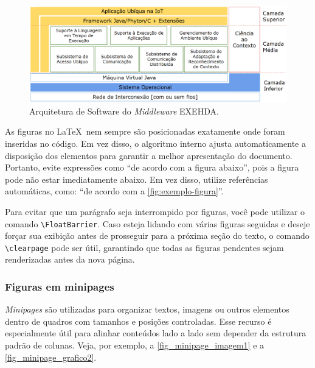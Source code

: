 \begin{figure}[!htbp]
    \centering
    \caption{\label{fig:exemplo-figura} Arquitetura de Software do \textit{Middleware} EXEHDA.}
    \includegraphics[width=\textwidth]{img/ArquiteturaExehda_v4-pt_BR.png}
    
\end{figure}

As figuras no \LaTeX\ nem sempre são posicionadas exatamente onde foram inseridas no código. Em vez disso, o algoritmo interno ajusta automaticamente a disposição dos elementos para garantir a melhor apresentação do documento. Portanto, evite expressões como ``de acordo com a figura abaixo'', pois a figura pode não estar imediatamente abaixo. Em vez disso, utilize referências automáticas, como: ``de acordo com a \autoref{fig:exemplo-figura}''.

Para evitar que um parágrafo seja interrompido por figuras, você pode utilizar o comando \verb|\FloatBarrier|. Caso esteja lidando com várias figuras seguidas e deseje forçar sua exibição antes de prosseguir para a próxima seção do texto, o comando \verb|\clearpage| pode ser útil, garantindo que todas as figuras pendentes sejam renderizadas antes da nova página.

\subsubsection{Figuras em minipages}
\emph{Minipages} são utilizadas para organizar textos, imagens ou outros elementos dentro de quadros com tamanhos e posições controladas. Esse recurso é especialmente útil para alinhar conteúdos lado a lado sem depender da estrutura padrão de colunas. Veja, por exemplo, a \autoref{fig_minipage_imagem1} e a \autoref{fig_minipage_grafico2}.

